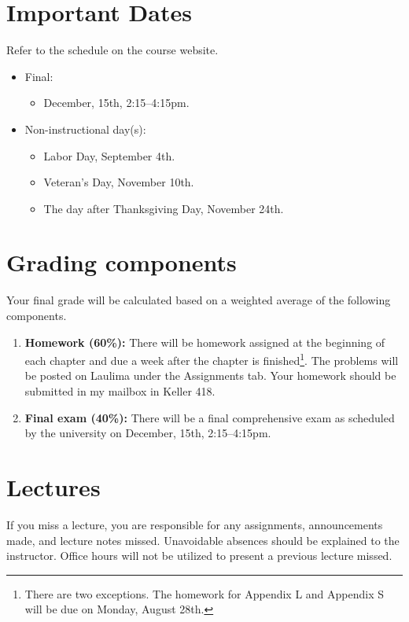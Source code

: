 \documentclass[12pt]{amsart}
\begin{document}
\section*{Important Dates}
Refer to the schedule on the course website.
	\begin{itemize}
	\item Final:
		\begin{itemize}
		\item December, 15th, 2:15--4:15pm.
		\end{itemize}
	\item Non-instructional day(s):
		\begin{itemize}
		\item Labor Day, September 4th.
		\item Veteran's Day, November 10th.
		\item The day after Thanksgiving Day, November 24th.
		\end{itemize}
	\end{itemize}

\section*{Grading components}
Your final grade will be calculated based on a weighted average of the following components.
\begin{enumerate}
\item{\bf Homework (60\%):} There will be homework assigned at the beginning of each chapter and due a week after the chapter is finished\footnote{There are two exceptions. The homework for Appendix L and Appendix S will be due on Monday, August 28th.}. The problems will be posted on Laulima under the Assignments tab. Your homework should be submitted in my mailbox in Keller 418.
\item {\bf Final exam (40\%):} There will be a final comprehensive exam as scheduled by the university on December, 15th, 2:15--4:15pm.
\end{enumerate}

\section*{Lectures}
If you miss a lecture, you are responsible for any assignments, announcements made, and lecture notes missed. Unavoidable absences should be explained to the instructor. Office hours will not be utilized to present a previous lecture missed.
\end{document}
